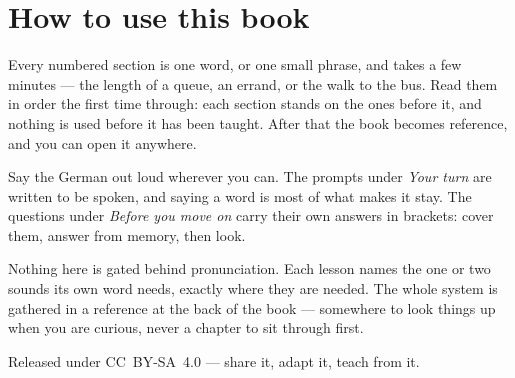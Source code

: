 \documentclass[11pt,twoside]{book}
\begin{document}
\section*{How to use this book}

Every numbered section is one word, or one small phrase, and takes a few
minutes --- the length of a queue, an errand, or the walk to the bus. Read them
in order the first time through: each section stands on the ones before it, and
nothing is used before it has been taught. After that the book becomes
reference, and you can open it anywhere.

Say the German out loud wherever you can. The prompts under \emph{Your turn}
are written to be spoken, and saying a word is most of what makes it stay. The
questions under \emph{Before you move on} carry their own answers in brackets:
cover them, answer from memory, then look.

Nothing here is gated behind pronunciation. Each lesson names the one or two
sounds its own word needs, exactly where they are needed. The whole system is
gathered in a reference at the back of the book --- somewhere to look things up
when you are curious, never a chapter to sit through first.

Released under CC~BY-SA~4.0 --- share it, adapt it, teach from it.

\tableofcontents

\mainmatter




































\backmatter






\end{document}
